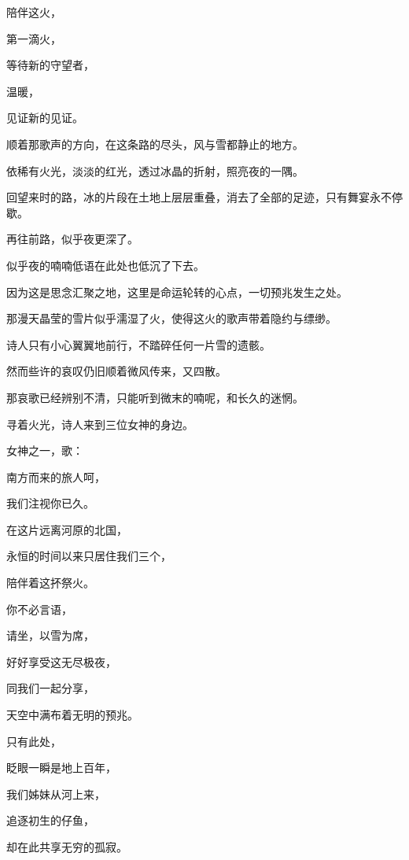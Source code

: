 \documentclass[UTF8]{article}
\begin{document}
\par 陪伴这火，
\par 第一滴火，
\par 等待新的守望者，
\par 温暖，
\par 见证新的见证。
\\[0.6cm]
\par 顺着那歌声的方向，在这条路的尽头，风与雪都静止的地方。
\par 依稀有火光，淡淡的红光，透过冰晶的折射，照亮夜的一隅。
\par 回望来时的路，冰的片段在土地上层层重叠，消去了全部的足迹，只有舞宴永不停歇。
\\[0.6cm]
\par 再往前路，似乎夜更深了。
\par 似乎夜的喃喃低语在此处也低沉了下去。
\par 因为这是思念汇聚之地，这里是命运轮转的心点，一切预兆发生之处。
\\[0.6cm]
\par 那漫天晶莹的雪片似乎濡湿了火，使得这火的歌声带着隐约与缥缈。
\par 诗人只有小心翼翼地前行，不踏碎任何一片雪的遗骸。
\par 然而些许的哀叹仍旧顺着微风传来，又四散。
\\[0.6cm]
\par 那哀歌已经辨别不清，只能听到微末的喃呢，和长久的迷惘。
\par 寻着火光，诗人来到三位女神的身边。
\\[0.6cm]
\par 女神之一，歌：
\\[0.6cm]
\par 南方而来的旅人呵，
\par 我们注视你已久。
\par 在这片远离河原的北国，
\par 永恒的时间以来只居住我们三个，
\par 陪伴着这抔祭火。
\par 你不必言语，
\par 请坐，以雪为席，
\par 好好享受这无尽极夜，
\par 同我们一起分享，
\par 天空中满布着无明的预兆。
\par 只有此处，
\par 眨眼一瞬是地上百年，
\par 我们姊妹从河上来，
\par 追逐初生的仔鱼，
\par 却在此共享无穷的孤寂。
\end{document}
